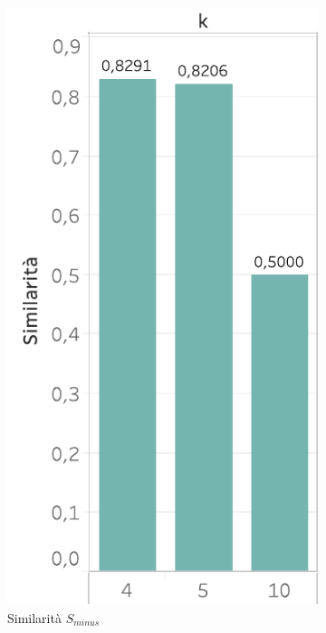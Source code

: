 \begin{figure}
  \centering
   \begin{subfigure}{.5\textwidth}
  \centering
      \includegraphics[scale=0.6]{res/fig/sec-4/scalability/ComparisonKSimilarity.pdf}
  \caption{Similarità \(S_{minus}\)}%
\end{subfigure}%
\begin{subfigure}{.5\textwidth}
  \centering

\end{subfigure}
\end{figure}
